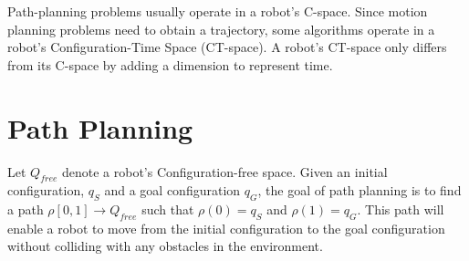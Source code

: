 \documentclass[10pt,conference]{ieeeconf}
\begin{document}
Path-planning problems usually operate in a robot's C-space. Since motion planning problems need to obtain a trajectory, some algorithms operate in a robot's Configuration-Time Space (CT-space). A robot's CT-space only differs from its C-space by adding a dimension to represent time.


\section{Path Planning} \label{sec:probform}


%
% 



Let $Q_{free}$ denote a robot's Configuration-free space. Given an initial configuration, $q_S$ and a goal configuration $q_G$, the goal of path planning is to find a path $\rho[0,1] \rightarrow Q_{free}$ such that $\rho(0) = q_S$ and $\rho(1) = q_G$. This path will enable a robot to move from the initial configuration to the goal configuration without colliding with any obstacles in the environment.
\end{document}

